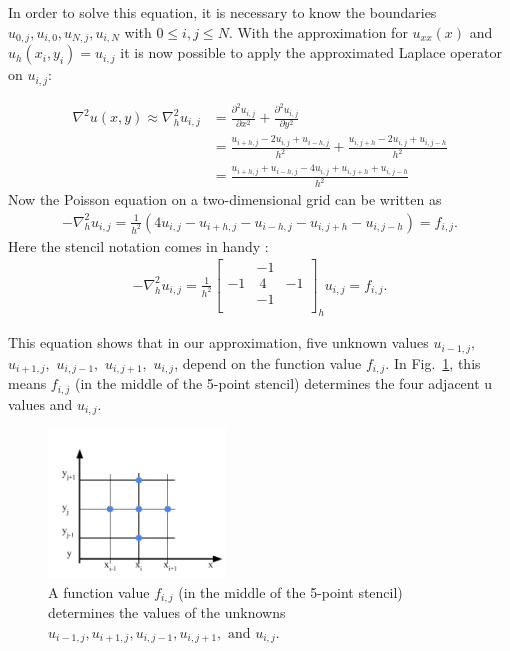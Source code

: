 In order to solve this equation, it is necessary to know the boundaries $u_{0,j}, u_{i,0}, u_{N,j}, u_{i, N}$ with $0 \leq i,j \leq N$.
With the approximation for $u_{xx}(x)$ and $u_h (x_i,y_i) = u_{i,j}$ it is now possible to apply the approximated Laplace operator on $u_{i,j}$:

\begin{align}
\nabla^2 u(x,y) \approx \nabla^2_h u_{i,j}   &= \frac{\partial^2 u_{i,j} }{\partial x^2} + \frac{\partial^2 u_{i,j} }{\partial y^2} \nonumber \\
                      &= \frac{u_{i+h,j} - 2 u_{i,j} + u_{i-h,j} }{h^2} + \frac{u_{i,j+h} - 2 u_{i,j} + u_{i,j-h} }{h^2}\\
                      &= \frac{u_{i+h,j} + u_{i-h,j} - 4 u_{i,j} + u_{i,j+h} + u_{i,j-h} }{h^2} \nonumber
\end{align}
Now the Poisson equation on a two-dimensional grid can be written as
\begin{align}
-\nabla^2_h u_{i,j} = \frac{1}{h^2} (4 u_{i,j} -u_{i+h,j} - u_{i-h,j}  - u_{i,j+h} - u_{i,j-h} ) = f_{i,j}.
\end{align}
Here the stencil notation comes in handy \cite{Trottenberg:2000:MUL:374106}:
\begin{align}
-\nabla^2_h u_{i,j} = \frac{1}{h^2} 
\begin{bmatrix}
& -1 & \\
-1 & ~4 & -1 \\
& -1 & \\
\end{bmatrix}_h u_{i,j}
= f_{i,j}.
\label{equ:dis_poisson}
\end{align}

This equation shows that in our approximation, five unknown values $u_{i-1,j},$ $u_{i+1,j},$ $u_{i,j-1},$ $u_{i,j+1},$ $u_{i,j}$, depend on the function value $f_{i,j}$. In Fig.~\ref{fig:nat_order}, this means $f_{i,j}$ (in the middle of the 5-point stencil) determines the four adjacent u values and $u_{i,j}$.

\begin{figure}[tbp]
	\centering
\includegraphics[width=0.42\textwidth]{chapters/chapter01/linear_order.pdf}
	\caption{A function value $f_{i,j}$ (in the middle of the 5-point stencil) determines the values of the unknowns $u_{i-1,j}, u_{i+1,j}, u_{i,j-1}, u_{i,j+1}, \textrm{ and } u_{i,j}$. }
	\label{fig:nat_order}
\end{figure}


